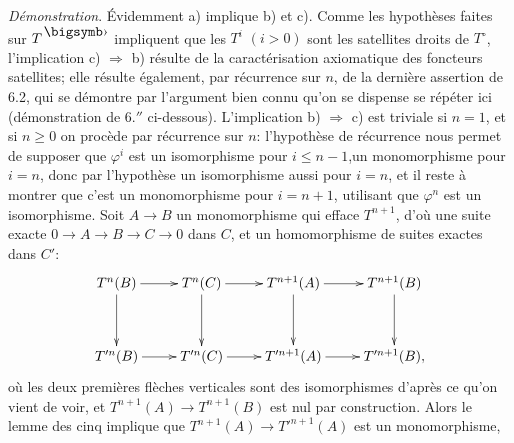 \documentclass[10pt]{../fichiers-configuration-latex/smfart}
\begin{document}
\noindent
\emph{Démonstration}. Évidemment a) implique b) et c). Comme les
hypothèses faites sur $T^{\bigdot}$ impliquent que les $T^{i}$ $(i>0)$ sont les
satellites droits de $T^{\circ}$, l'implication c) $\Rightarrow$ b)
résulte de la caractérisation axiomatique des foncteurs satellites;
elle résulte également, par récurrence sur $n$, de la dernière
assertion de 6.2, qui se démontre par l'argument bien connu qu'on se
dispense se répéter ici (\cf démonstration de 6.$''$
ci-dessous). L'implication b) $\Rightarrow$ c) est triviale si $n=1$,
et si $n\geq 0$ on procède par récurrence sur $n$: l'hypothèse de
récurrence nous permet de supposer que $\varphi^{i}$ est un
isomorphisme pour $i\leq n-1$,\pageoriginale un monomorphisme pour
$i=n$, donc par l'hypothèse un isomorphisme aussi pour $i=n$, et il
reste à montrer que c'est un monomorphisme pour $i=n+1$, utilisant que
$\varphi^n$ est un isomorphisme. Soit $A\rightarrow B$ un
monomorphisme qui efface $T^{n+1}$, d'où une suite exacte $0\rightarrow
A\rightarrow B\rightarrow C\rightarrow 0$ dans $C$, et un
homomorphisme de suites exactes dans $C'$:
$$
\xymatrix@R=1.25cm{
T^{n}(B)  \ar[r] \ar[d]& T^{n}(C)  \ar[r]\ar[d] & T^{n+1}(A) \ar[d] \ar[r] & T^{n+1}(B)\ar[d]\\
T'^{n}(B)  \ar[r] & T'^{n}(C) \ar[r] & T'^{n+1}(A)  \ar[r] &
T'^{n+1}(B),
}
$$
où les deux premières flèches verticales sont des isomorphismes
d'après ce qu'on vient de voir, et $T^{n+1}(A)\rightarrow T^{n+1}(B)$
est nul par construction. Alors le lemme des cinq implique que
$T^{n+1}(A)\rightarrow {T'}^{n+1}(A)$ est un monomorphisme, \cqfd
\end{document}
